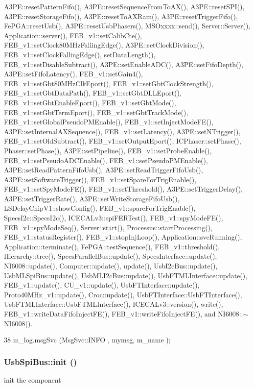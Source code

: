 A3PE::resetPatternFifo(), A3PE::resetSequenceFromToAX(), A3PE::resetSPI(), A3PE::resetStorageFifo(), A3PE::resetToAXRam(), A3PE::resetTriggerFifo(), FePGA::resetUsb(), A3PE::resetUsbPhasers(), MSOxxxx::send(), Server::Server(), Application::server(), FEB\_\-v1::setCalibCte(), FEB\_\-v1::setClock80MHzFallingEdge(), A3PE::setClockDivision(), FEB\_\-v1::setClockFallingEdge(), setDataLength(), FEB\_\-v1::setDisableSubtract(), A3PE::setEnableADC(), A3PE::setFifoDepth(), A3PE::setFifoLatency(), FEB\_\-v1::setGain4(), FEB\_\-v1::setGbt80MHzClkEport(), FEB\_\-v1::setGbtClockStrength(), FEB\_\-v1::setGbtDataPath(), FEB\_\-v1::setGbtDLLEport(), FEB\_\-v1::setGbtEnableEport(), FEB\_\-v1::setGbtMode(), FEB\_\-v1::setGbtTermEport(), FEB\_\-v1::setGbtTrackMode(), FEB\_\-v1::setGlobalPseudoPMEnable(), FEB\_\-v1::setInjectModeFE(), A3PE::setInternalAXSequence(), FEB\_\-v1::setLatency(), A3PE::setNTrigger(), FEB\_\-v1::setOldSubtract(), FEB\_\-v1::setOutputEport(), ICPhaser::setPhase(), Phaser::setPhase(), A3PE::setPipeline(), FEB\_\-v1::setProbeEnable(), FEB\_\-v1::setPseudoADCEnable(), FEB\_\-v1::setPseudoPMEnable(), A3PE::setReadPatternFifoUsb(), A3PE::setReadTriggerFifoUsb(), A3PE::setSoftwareTrigger(), FEB\_\-v1::setSpareForTrigEnable(), FEB\_\-v1::setSpyModeFE(), FEB\_\-v1::setThreshold(), A3PE::setTriggerDelay(), A3PE::setTriggerRate(), A3PE::setWriteStorageFifoUsb(), LSDelayChipV1::showConfig(), FEB\_\-v1::spareForTrigEnable(), SpecsI2c::SpecsI2c(), ICECALv3::spiFERTest(), FEB\_\-v1::spyModeFE(), FEB\_\-v1::spyModeSeq(), Server::start(), Processus::startProcessing(), FEB\_\-v1::statusRegister(), FEB\_\-v1::stopInjLoop(), Application::svcRunning(), Application::terminate(), FePGA::testSequence(), FEB\_\-v1::threshold(), Hierarchy::tree(), SpecsParallelBus::update(), SpecsInterface::update(), NI6008::update(), Computer::update(), update(), UsbI2cBus::update(), UsbMLSpiBus::update(), UsbMLI2cBus::update(), UsbFTMLInterface::update(), FEB\_\-v1::update(), CU\_\-v1::update(), UsbFTInterface::update(), Proto40MHz\_\-v1::update(), Croc::update(), UsbFTInterface::UsbFTInterface(), UsbFTMLInterface::UsbFTMLInterface(), ICECALv3::version(), write(), FEB\_\-v1::writeDataFifoInjectFE(), FEB\_\-v1::writeFifoInjectFE(), and NI6008::$\sim$NI6008().


\begin{DoxyCode}
38 { m_log.msgSvc (MsgSvc::INFO    , mymsg, m_name ); }
\end{DoxyCode}
\hypertarget{classUsbSpiBus_a38203aaf0806b9a1c7cc0686831a7ce9}{
\subsubsection[{init}]{ UsbSpiBus::init ()}}
\label{classUsbSpiBus_a38203aaf0806b9a1c7cc0686831a7ce9}
init the component

